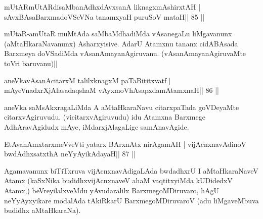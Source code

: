 
\begin{shl}
mUtARmUtARdisaMbanAdhxdAvxsanA liknagxmAshirxtAH |
sAvxBAsaBarxmadoVSeVNa tanamxyaH puruSoV mataH\hfill || 85 ||
\end{shl}

\begin{artha}
mUtaR-amUtaR muMtAda saMbaMdhadiMda vAsanegaLu liMgavanunx
(aMtaHkaraNavanunx) Asharxyisive. AdarU Atamxnu tananx cidABAsada
Barxmeya doVSadiMda vAsanAmayanAgiruvanu. (vAsanAmayanAgiruvaMte toVri baruvanu)|| 
\end{artha}

\begin{shl}
aneVkavAsanAcitarxM talilxknagxM paTaBititxvatf |
mAyeVnadxrXjAlasadaqshaM vAyxmoVhAsapxdamAtamxnaH\hfill || 86 ||
\end{shl}

\begin{artha}
aneVka saMsAkxragaLiMda A aMtaHkaraNavu citarxpaTada goVDeyaMte citarxvAgiruvudu. (vicitarxvAgiruvudu) idu Atamxna Barxmege AdhAravAgidudx mAye, iMdarxjAlagaLige samAnavAgide.
\end{artha}



\begin{shl}
EtAvanAmxtarxmeVveVti yatarx BArxnAtx nirAgamAH |
vijAcnxnavAdinoV bwdAdhxsatxthA neYyAyikAdayaH\hfill || 87 ||
\end{shl}

\begin{artha}
Agamavanunx biTiTxruva vijAcnxnavAdigaLAda bwdadhxrU I aMtaHkaraNaveV Atamx (kaSxNika budidhxvijAcnxnaveV ahaM vaqtitxyiMda kUDidedxV Atamx,) beVreyilalxveMdu yAvudaralilx BarxmegoMDiruvaro, hAgU neYyAyxyikare modalAda tAkiRkarU BarxmegoMDiruvaroV (adu liMgaveMbuva budidhx aMtaHkaraNa).
\end{artha}

